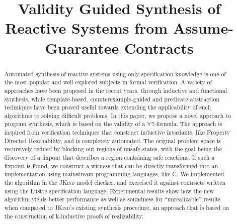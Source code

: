 \documentclass[10pt,conference]{IEEEtran}
\newcommand{\jkind}{\textsc{JKind}\xspace}
\newcounter{template}
\begin{document}
\title{Validity Guided Synthesis of Reactive Systems from Assume-Guarantee Contracts}

\iffalse
\author{\IEEEauthorblockN{Andreas Katis\IEEEauthorrefmark{1}, Grigory Fedyukovich\IEEEauthorrefmark{2}, Huajun
Guo\IEEEauthorrefmark{1}, Andrew Gacek\IEEEauthorrefmark{3}\\ John
Backes\IEEEauthorrefmark{3}, Arie Gurfinkel\IEEEauthorrefmark{4} and
Michael W. Whalen\IEEEauthorrefmark{1}}
\IEEEauthorblockA{\IEEEauthorrefmark{1}Department of Computer Science and
Engineering,
University of Minnesota\\
Email: \{katis001,guoxx663\}@umn.edu, whalen@cs.umn.edu}
\IEEEauthorblockA{\IEEEauthorrefmark{2}University of Washington Paul G. Allen School of Computer Science \& Engineering\\
Email: grigory@cs.washington.edu}
\IEEEauthorblockA{\IEEEauthorrefmark{3}Rockwell Collins Advanced Technology Center\\
Email: \{andrew.gacek,john.backes\}@rockwellcollins.com}
\IEEEauthorblockA{\IEEEauthorrefmark{4}Department of Electrical and Computer
Engineering, University of Waterloo\\
Email: agurfinkel@uwaterloo.ca}}
\fi
\maketitle

\begin{abstract}
Automated synthesis of reactive systems using only specification knowledge is one of
the most popular and well explored subjects in formal verification. A variety of
approaches have been proposed in the recent years, through inductive and
functional synthesis, while template-based, counterexample-guided and predicate abstraction techniques
have been proved useful towards extending the applicability of such algorithms
to solving difficult problems. In this paper, we propose a novel approach to
program synthesis, which is based on the validity of a $\forall\exists$-formula.
The approach is inspired from verification techniques that construct
inductive invariants, like Property Directed Reachability, and is completely automated. The original
problem space is recursively refined by blocking out regions of unsafe states, with the goal being the discovery of a
fixpont that describes a region containing safe reactions. If such a fixpoint
is found, we construct a witness that can be directly transformed into an
implementation using mainstream programming languages, like C. We implemented
the algorithm in the \jkind model checker, and exercised it against contracts
written using the Lustre specification language. Experimental results show how
the new algorithm yields better performance as well as soundness for ``unrealizable'' results when compared to \jkind's existing synthesis procedure, an approach that is based on the construction of k-inductive proofs of realizability.
\end{abstract}
\end{document}
